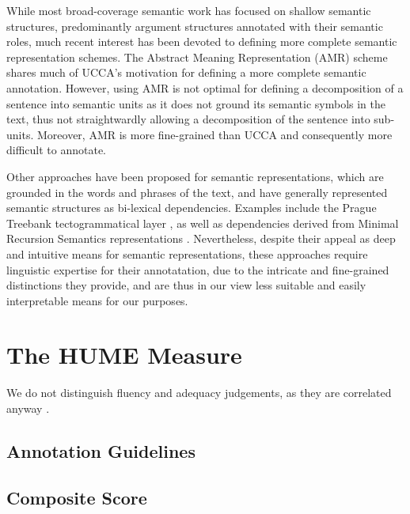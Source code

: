 \documentclass[11pt]{article}
\begin{document}
While most broad-coverage semantic work has focused on shallow semantic structures,
predominantly argument structures annotated with their semantic roles, much recent
interest has been devoted to defining more complete semantic representation schemes.
The Abstract Meaning Representation (AMR) scheme \cite{banarescu2013abstract}
shares much of UCCA's motivation for defining a more complete semantic annotation.
However, using AMR is not optimal for defining a decomposition of a sentence into semantic
units as it does not ground its semantic symbols in the text,
thus not straightwardly allowing a decomposition of the sentence into sub-units.
Moreover, AMR is more fine-grained than UCCA and consequently more difficult to annotate.

Other approaches have been proposed for semantic representations, which are grounded in the words
and phrases of the text, and have generally represented semantic structures as bi-lexical dependencies.
Examples include the Prague Treebank tectogrammatical layer \cite{hajic2012announcing}, as well
as dependencies derived from Minimal Recursion Semantics representations \cite{oepen2006discriminant}.
Nevertheless, despite their appeal as deep and intuitive means for semantic representations,
these approaches require linguistic expertise for their annotatation, due to the intricate and
fine-grained distinctions they provide, and are thus in our view less suitable and
easily interpretable means for our purposes.


\section{The HUME Measure}\label{sec:hume}

We do not distinguish fluency and adequacy judgements, as they are correlated anyway \cite{ccb}.

\subsection{Annotation Guidelines}\label{sec:guidelines}


\subsection{Composite Score}\label{sec:score}
\end{document}
